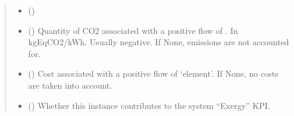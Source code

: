 \documentclass[letterpaper,10pt,english]{sphinxmanual}
\begin{document}
\begin{fulllineitems}
\begin{fulllineitems}
\begin{itemize}
\end{itemize}
\begin{quote}\begin{description}
\begin{itemize}
\item {} 
\sphinxAtStartPar
{} ({\hyperref[\detokenize{generated/tamos.element.ElectricityVector:tamos.element.ElectricityVector}]{}}) \textendash{} 

\item {} 
\sphinxAtStartPar
{} (\sphinxstyleliteralemphasis{\sphinxupquote{, }}\sphinxstyleliteralemphasis{\sphinxupquote{, }}) \textendash{} Quantity of CO2 associated with a positive flow of .
In kgEqCO2/kWh.
Usually negative.
If None, emissions are not accounted for.

\item {} 
\sphinxAtStartPar
{} ({\hyperref[\detokenize{generated/tamos.elementIO.Cost:tamos.elementIO.Cost}]{}}\sphinxstyleliteralemphasis{\sphinxupquote{, }}) \textendash{} Cost associated with a positive flow of ‘element’.
If None, no costs are taken into account.

\item {} 
\sphinxAtStartPar
{} (\sphinxstyleliteralemphasis{\sphinxupquote{, }}\sphinxstyleliteralemphasis{\sphinxupquote{, }}) \textendash{} Whether this instance contributes to the system “Exergy” KPI.


\end{itemize}
\end{description}
\end{quote}
\end{fulllineitems}
\end{fulllineitems}
\end{document}
